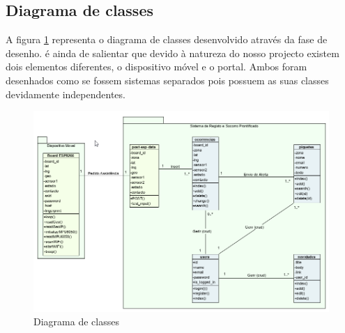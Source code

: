 \FloatBarrier\subsection{Diagrama de classes}

A figura \ref{fig:diagrama_classes} representa o diagrama de classes desenvolvido através da fase de desenho. é ainda de salientar que devido à natureza do nosso projecto existem dois elementos diferentes, o dispositivo móvel e o portal. Ambos foram desenhados como se fossem sistemas separados pois possuem as suas classes devidamente independentes.


\begin{figure}[!htb]
	\centering
	\includegraphics[width=\textwidth]{figuras/diagrama_classes.png}
	\caption{Diagrama de classes}
	\label{fig:diagrama_classes}
\end{figure}

